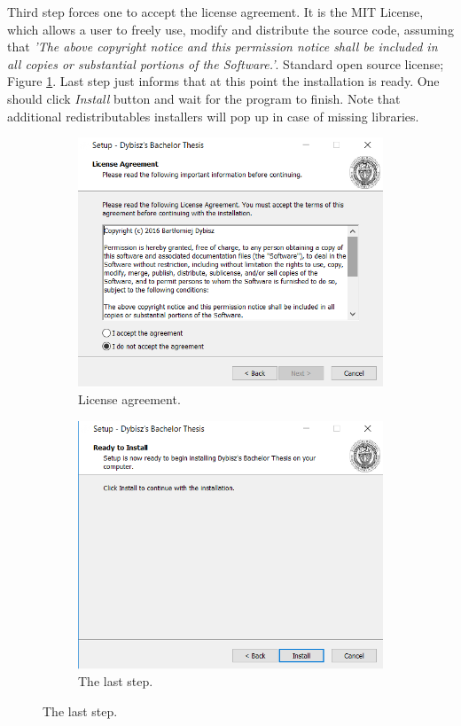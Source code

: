 \documentclass{report}
\begin{document}
Third step forces one to accept the license agreement. It is the MIT License, which allows a user to freely use, modify and distribute the source code, assuming that \textit{'The above copyright notice and this permission notice shall be included in all copies or substantial portions of the Software.'}. Standard open source license; Figure \ref{fig:isntallation_3}. Last step just informs that at this point the installation is ready. One should click \textit{Install} button and wait for the program to finish. Note that additional redistributables installers will pop up in case of missing libraries.

\begin{figure}[H]
\begin{subfigure}{.5\textwidth}
  \centering
  \includegraphics[width=.9\linewidth]{images/installation_3.png}
  \caption{License agreement.}
  \label{fig:isntallation_3}
\end{subfigure}%
\begin{subfigure}{.5\textwidth}
  \centering
  \includegraphics[width=.9\linewidth]{images/installation_4.png}
  \caption{The last step.}
  \label{fig:sfig2}
\end{subfigure}
\label{fig:installation_4}
\end{figure}
\end{document}
